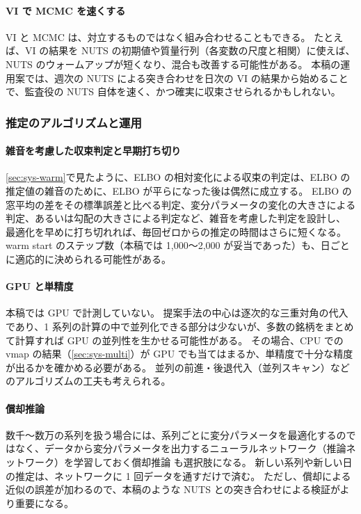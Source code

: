 \paragraph{VI で MCMC を速くする}
VI と MCMC は、対立するものではなく組み合わせることもできる。
たとえば、VI の結果を NUTS の初期値や質量行列（各変数の尺度と相関）に使えば、NUTS のウォームアップが短くなり、混合も改善する可能性がある。
本稿の運用案では、週次の NUTS による突き合わせを日次の VI の結果から始めることで、監査役の NUTS 自体を速く、かつ確実に収束させられるかもしれない。

\subsubsection{推定のアルゴリズムと運用}

\paragraph{雑音を考慮した収束判定と早期打ち切り}
\cref{sec:sys-warm}で見たように、ELBO の相対変化による収束の判定は、ELBO の推定値の雑音のために、ELBO が平らになった後は偶然に成立する。
ELBO の窓平均の差をその標準誤差と比べる判定、変分パラメータの変化の大きさによる判定、あるいは勾配の大きさによる判定など、雑音を考慮した判定を設計し、
最適化を早めに打ち切れれば、毎回ゼロからの推定の時間はさらに短くなる。
warm start のステップ数（本稿では 1,000〜2,000 が妥当であった）も、日ごとに適応的に決められる可能性がある。

\paragraph{GPU と単精度}
本稿では GPU で計測していない。
提案手法の中心は逐次的な三重対角の代入であり、1 系列の計算の中で並列化できる部分は少ないが、多数の銘柄をまとめて計算すれば GPU の並列性を生かせる可能性がある。
その場合、CPU での vmap の結果（\cref{sec:sys-multi}）が GPU でも当てはまるか、単精度で十分な精度が出るかを確かめる必要がある。
並列の前進・後退代入（並列スキャン）などのアルゴリズムの工夫も考えられる。

\paragraph{償却推論}
数千〜数万の系列を扱う場合には、系列ごとに変分パラメータを最適化するのではなく、データから変分パラメータを出力するニューラルネットワーク（推論ネットワーク）を学習しておく償却推論 \parencite{archer2015,krishnan2017}も選択肢になる。
新しい系列や新しい日の推定は、ネットワークに 1 回データを通すだけで済む。
ただし、償却による近似の誤差が加わるので、本稿のような NUTS との突き合わせによる検証がより重要になる。

